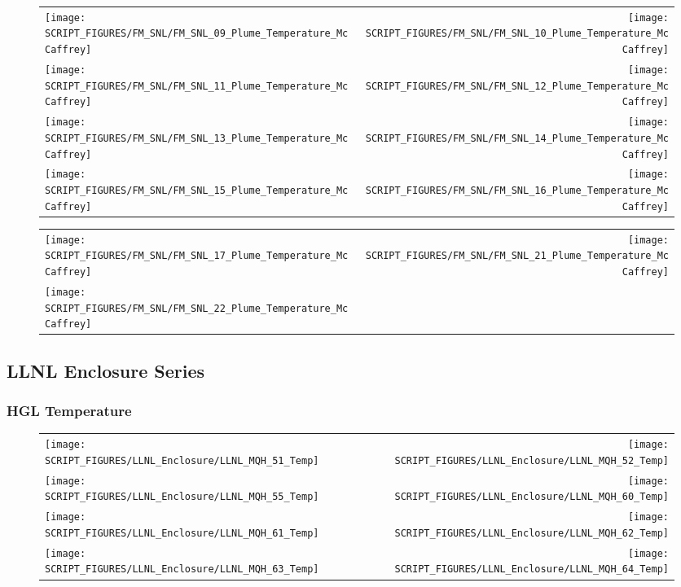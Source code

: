 \begin{figure}[!ht]
\begin{tabular*}{\textwidth}{l@{\extracolsep{\fill}}r}
\texttt{[image: SCRIPT\_FIGURES/FM\_SNL/FM\_SNL\_09\_Plume\_Temperature\_McCaffrey]} &
\texttt{[image: SCRIPT\_FIGURES/FM\_SNL/FM\_SNL\_10\_Plume\_Temperature\_McCaffrey]} \\
\texttt{[image: SCRIPT\_FIGURES/FM\_SNL/FM\_SNL\_11\_Plume\_Temperature\_McCaffrey]} &
\texttt{[image: SCRIPT\_FIGURES/FM\_SNL/FM\_SNL\_12\_Plume\_Temperature\_McCaffrey]} \\
\texttt{[image: SCRIPT\_FIGURES/FM\_SNL/FM\_SNL\_13\_Plume\_Temperature\_McCaffrey]} &
\texttt{[image: SCRIPT\_FIGURES/FM\_SNL/FM\_SNL\_14\_Plume\_Temperature\_McCaffrey]} \\
\texttt{[image: SCRIPT\_FIGURES/FM\_SNL/FM\_SNL\_15\_Plume\_Temperature\_McCaffrey]} &
\texttt{[image: SCRIPT\_FIGURES/FM\_SNL/FM\_SNL\_16\_Plume\_Temperature\_McCaffrey]}
\end{tabular*}
\end{figure}

\begin{figure}[!ht]
\begin{tabular*}{\textwidth}{l@{\extracolsep{\fill}}r}
\texttt{[image: SCRIPT\_FIGURES/FM\_SNL/FM\_SNL\_17\_Plume\_Temperature\_McCaffrey]} &
\texttt{[image: SCRIPT\_FIGURES/FM\_SNL/FM\_SNL\_21\_Plume\_Temperature\_McCaffrey]} \\
\texttt{[image: SCRIPT\_FIGURES/FM\_SNL/FM\_SNL\_22\_Plume\_Temperature\_McCaffrey]}
\end{tabular*}
\end{figure}

\clearpage

\subsection{LLNL Enclosure Series}

\subsubsection{HGL Temperature}

\begin{figure}[!ht]
\begin{tabular*}{\textwidth}{l@{\extracolsep{\fill}}r}
\texttt{[image: SCRIPT\_FIGURES/LLNL\_Enclosure/LLNL\_MQH\_51\_Temp]} &
\texttt{[image: SCRIPT\_FIGURES/LLNL\_Enclosure/LLNL\_MQH\_52\_Temp]} \\
\texttt{[image: SCRIPT\_FIGURES/LLNL\_Enclosure/LLNL\_MQH\_55\_Temp]} &
\texttt{[image: SCRIPT\_FIGURES/LLNL\_Enclosure/LLNL\_MQH\_60\_Temp]} \\
\texttt{[image: SCRIPT\_FIGURES/LLNL\_Enclosure/LLNL\_MQH\_61\_Temp]} &
\texttt{[image: SCRIPT\_FIGURES/LLNL\_Enclosure/LLNL\_MQH\_62\_Temp]} \\
\texttt{[image: SCRIPT\_FIGURES/LLNL\_Enclosure/LLNL\_MQH\_63\_Temp]} &
\texttt{[image: SCRIPT\_FIGURES/LLNL\_Enclosure/LLNL\_MQH\_64\_Temp]}
\end{tabular*}
\end{figure}

